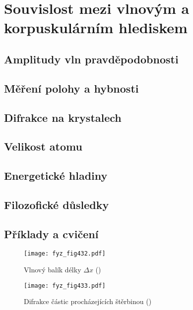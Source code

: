 \chapter{Souvislost mezi vlnovým a korpuskulárním hlediskem}\label{fyz:IchapXXXVIII}
\minitoc
\section{Amplitudy vln pravděpodobnosti}\label{fyz:IchapXXXVIIIsecI}
\section{Měření polohy a hybnosti}\label{fyz:IchapXXXVIIIsecII}
\section{Difrakce na krystalech}\label{fyz:IchapXXXVIIIsecIII}
\section{Velikost atomu}\label{fyz:IchapXXXVIIIsecIV}
\section{Energetické hladiny}\label{fyz:IchapXXXVIIIsecV}
\section{Filozofické důsledky}\label{fyz:IchapXXXVIIIsecVI}
\section{Příklady a cvičení}\label{fyz:IchapXXXVIIIsecVII}

  \begin{figure}[ht!] %
    \centering
    \texttt{[image: fyz\_fig432.pdf]}
    \caption{Vlnový balík délky \(\Delta x\)
             (\cite[s.~510]{Feynman01})}
    \label{fyz:fig432}
  \end{figure}

  \begin{figure}[ht!] %
    \centering
    \texttt{[image: fyz\_fig433.pdf]}
    \caption{Difrakce částic procházejících štěrbinou 
             (\cite[s.~511]{Feynman01})}
    \label{fyz:fig433}
  \end{figure}

